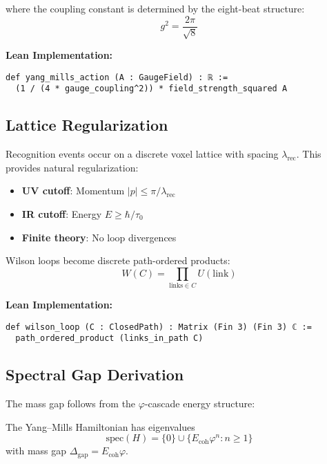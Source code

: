 \documentclass[11pt]{amsart}
\newcommand{\Ecoh}{E_{\text{coh}}}
\newcommand{\lambdarec}{\lambda_{\text{rec}}}
\newcommand{\taunaught}{\tau_0}
\newcommand{\massGap}{\Delta_{\text{gap}}}
\begin{document}
where the coupling constant is determined by the eight-beat structure:
\begin{equation}
g^2 = \frac{2\pi}{\sqrt{8}}
\end{equation}

\textbf{Lean Implementation:}
\begin{lstlisting}
def yang_mills_action (A : GaugeField) : ℝ :=
  (1 / (4 * gauge_coupling^2)) * field_strength_squared A
\end{lstlisting}

\subsection{Lattice Regularization}

Recognition events occur on a discrete voxel lattice with spacing $\lambdarec$. This provides natural regularization:

\begin{itemize}
\item \textbf{UV cutoff}: Momentum $|p| \leq \pi/\lambdarec$
\item \textbf{IR cutoff}: Energy $E \geq \hbar/\taunaught$  
\item \textbf{Finite theory}: No loop divergences
\end{itemize}

Wilson loops become discrete path-ordered products:
\begin{equation}
W(C) = \prod_{\text{links} \in C} U(\text{link})
\end{equation}

\textbf{Lean Implementation:}
\begin{lstlisting}
def wilson_loop (C : ClosedPath) : Matrix (Fin 3) (Fin 3) ℂ :=
  path_ordered_product (links_in_path C)
\end{lstlisting}

\subsection{Spectral Gap Derivation}

The mass gap follows from the $\varphi$-cascade energy structure:

\begin{theorem} \label{thm:spectral_gap}
The Yang--Mills Hamiltonian has eigenvalues
\begin{equation}
\text{spec}(H) = \{0\} \cup \{\Ecoh \varphi^n : n \geq 1\}
\end{equation}
with mass gap $\massGap = \Ecoh \varphi$.
\end{theorem}
\end{document}

